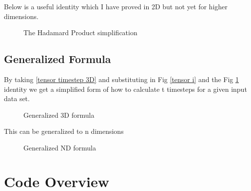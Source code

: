\documentclass{article}
\begin{document}
Below is a useful identity which I have proved in 2D but not yet for higher dimensions. 
\begin{figure}[H]
	\begin{mdframed}[backgroundcolor=myFigureColour]
	
	\caption{The Hadamard Product simplification}
	\label{hadamard product}
	\end{mdframed}
\end{figure}

\subsection{Generalized Formula}

By taking \ref{tensor timestep 3D} and substituting in Fig \ref{tensor i} and the Fig \ref{hadamard product} identity we get a simplified form of how to calculate t timesteps for a given input data set.

\begin{figure}[H]
	\begin{mdframed}[backgroundcolor=myFigureColour]
	
	
	\caption{Generalized 3D formula}
	\end{mdframed}
\end{figure}

This can be generalized to n dimensions
\begin{figure}[H]
	\begin{mdframed}[backgroundcolor=myFigureColour]
	
	\caption{Generalized ND formula}
	\end{mdframed}
\end{figure}

\section{Code Overview}
\end{document}
